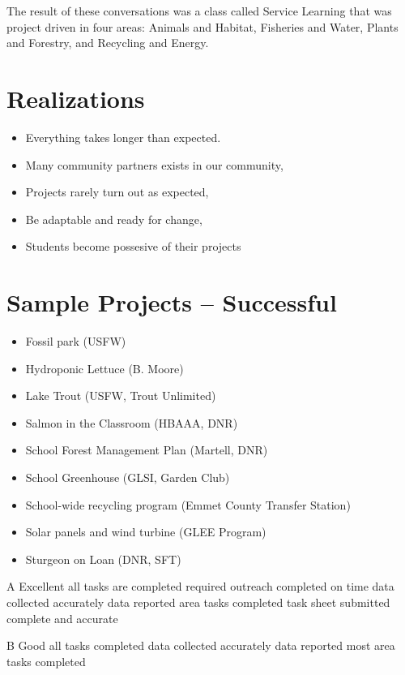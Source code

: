 \documentclass[letterpaper,10pt]{memoir}
\begin{document}
The result of these conversations was a class called Service Learning that was project driven in four areas: Animals and Habitat, Fisheries and Water, Plants and Forestry, and Recycling and Energy.


\section*{Realizations}
\begin{itemize}
\item Everything takes longer than expected.
\item Many community partners exists in our community,
\item Projects rarely turn out as expected,
\item Be adaptable and ready for change,
\item Students become possesive of their projects
\end{itemize}

\section*{Sample Projects -- Successful}
\begin{itemize}
\item Fossil park (USFW)
\item Hydroponic Lettuce (B. Moore)
\item Lake Trout (USFW, Trout Unlimited)
\item Salmon in the Classroom (HBAAA, DNR)
\item School Forest Management Plan (Martell, DNR)
\item School Greenhouse (GLSI, Garden Club)
\item School-wide recycling program (Emmet County Transfer Station)
\item Solar panels and wind turbine (GLEE Program)
\item Sturgeon on Loan (DNR, SFT)
\end{itemize}

 

\newpage
	

A	Excellent
all tasks are completed
required outreach completed on time
data collected accurately
data reported
area tasks completed
task sheet submitted complete and accurate


B	Good
all tasks completed
data collected accurately
data reported
most area tasks completed
\end{document}
